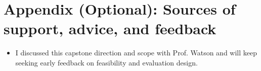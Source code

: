 \documentclass[11pt]{article}
\begin{document}
\section*{Appendix (Optional): Sources of support, advice, and feedback}

\begin{itemize}[leftmargin=1.4em, itemsep=0pt]
  \item I discussed this capstone direction and scope with Prof. Watson and will keep seeking early feedback on feasibility and evaluation design.
\end{itemize}
\end{document}
